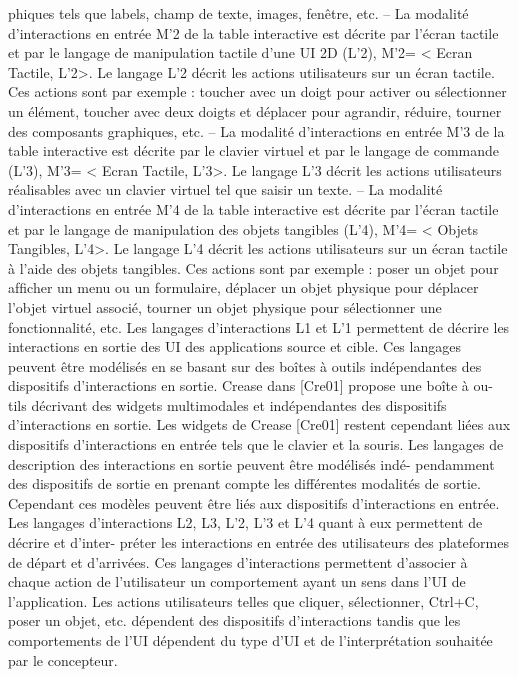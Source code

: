 \documentclass{article}
\begin{document}
phiques tels que labels, champ de texte, images, fenêtre, etc.
– La modalité d’interactions en entrée M’2 de la table interactive est décrite par l’écran tactile
et par le langage de manipulation tactile d’une UI 2D (L’2), M’2= < Ecran Tactile, L’2>. Le
langage L’2 décrit les actions utilisateurs sur un écran tactile. Ces actions sont par exemple :
toucher avec un doigt pour activer ou sélectionner un élément, toucher avec deux doigts et
déplacer pour agrandir, réduire, tourner des composants graphiques, etc.
– La modalité d’interactions en entrée M’3 de la table interactive est décrite par le clavier virtuel
et par le langage de commande (L’3), M’3= < Ecran Tactile, L’3>. Le langage L’3 décrit les
actions utilisateurs réalisables avec un clavier virtuel tel que saisir un texte.
– La modalité d’interactions en entrée M’4 de la table interactive est décrite par l’écran tactile et
par le langage de manipulation des objets tangibles (L’4), M’4= < Objets Tangibles, L’4>. Le
langage L’4 décrit les actions utilisateurs sur un écran tactile à l’aide des objets tangibles. Ces
actions sont par exemple : poser un objet pour afﬁcher un menu ou un formulaire, déplacer un
objet physique pour déplacer l’objet virtuel associé, tourner un objet physique pour sélectionner
une fonctionnalité, etc.
Les langages d’interactions L1 et L’1 permettent de décrire les interactions en sortie des UI des
applications source et cible. Ces langages peuvent être modélisés en se basant sur des boîtes à outils
indépendantes des dispositifs d’interactions en sortie. Crease dans [Cre01] propose une boîte à ou-
tils décrivant des widgets multimodales et indépendantes des dispositifs d’interactions en sortie. Les
widgets de Crease [Cre01] restent cependant liées aux dispositifs d’interactions en entrée tels que le
clavier et la souris. Les langages de description des interactions en sortie peuvent être modélisés indé-
pendamment des dispositifs de sortie en prenant compte les différentes modalités de sortie. Cependant
ces modèles peuvent être liés aux dispositifs d’interactions en entrée.
Les langages d’interactions L2, L3, L’2, L’3 et L’4 quant à eux permettent de décrire et d’inter-
préter les interactions en entrée des utilisateurs des plateformes de départ et d’arrivées. Ces langages
d’interactions permettent d’associer à chaque action de l’utilisateur un comportement ayant un sens
dans l’UI de l’application. Les actions utilisateurs telles que cliquer, sélectionner, Ctrl+C, poser un
objet, etc. dépendent des dispositifs d’interactions tandis que les comportements de l’UI dépendent du
type d’UI et de l’interprétation souhaitée par le concepteur.
\end{document}

